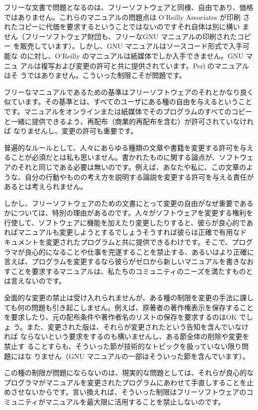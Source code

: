 \begin{multicols}{2}
フリーな文書で問題となるのは、フリーソフトウェアと同様、自由であり、価格
ではありません。これらのマニュアルの問題点は O'Reilly Associates が印刷
されたコピーに代価を要求するということではないのです\zdash それ自体は別に構い
ません（フリーソフトウェア財団も、フリーなGNU マニュアルの印刷されたコピー
を販売しています）。しかし、GNU マニュアルはソースコード形式で入手可能な
のに対し、O'Reilly のマニュアルは紙媒体でしか入手できません。GNU マニュ
アルは複写および変更の許可と共に提供されています。Perl のマニュアルはそ
うではありません。こういった制限こそが問題です。 

フリーなマニュアルであるための基準はフリーソフトウェアのそれとかなり良く
似ています。その基準とは、すべてのユーザにある種の自由を与えるということ
です。マニュアルをオンラインまたは紙媒体でそのプログラムのすべてのコピー
と一緒に提供できるよう、再配布（商業的再配布を含む）が許可されていなければ
なりませんし、変更の許可も重要です。 

普遍的なルールとして、人々にあらゆる種類の文章や書籍を変更する許可を与え
ることが必須だとは私も思いません。書かれたものに関する論点が、ソフトウェ
アのそれと同じである必要は無いのです。例えば、あなたや私に、この文章のよ
うな、自分の行動やものの考え方を説明する論説を変更する許可を与える責任が
あるとは考えられません。 

しかし、フリーソフトウェアのための文書にとって変更の自由がなぜ重要である
かについては、特別の理由があるのです。人々がソフトウェアを変更する権利を
行使して、ソフトウェアに機能を加えたり変更したりすると、彼らが良心的であ
ればマニュアルも変更しようとするでしょう\zdash そうすれば彼らは正確で有用なド
キュメントを変更されたプログラムと共に提供できるわけです。そこで、プログ
ラマが良心的になることや仕事を完遂することを禁止する、あるいはより正確に
言えば、プログラムを変更するなら彼らがゼロから新しいマニュアルを書きなお
すことを要求するマニュアルは、私たちのコミュニティのニーズを満たすものと
は言えないのです。 

全面的な変更の禁止は受け入れられませんが、ある種の制限を変更の手法に課し
ても何の問題も引き起こしません。例えば、原著者の著作権表示を保存すること
を要求したり、元の配布条件や著作者名のリストの保存を要求するのはOK でしょ
う。また、変更された版は、それらが変更されたという告知を含んでいなければ
ならないという要求をするのも構いませんし、ある節全体の削除や変更を禁止す
ることすらも、そういった節が技術的なトピックを扱っていない限り問題にはな
りません（GNU マニュアルの一部はそういった節を含んでいます）。 

この種の制限が問題にならないのは、現実的な問題としては、それらが良心的な
プログラマがマニュアルを変更されたプログラムにあわせて手直しすることを止
めさせないからです。言い換えれば、そういった制限はフリーソフトウェアのコ
ミュニティがマニュアルを最大限に活用することを禁止しないのです。 


\end{multicols}
